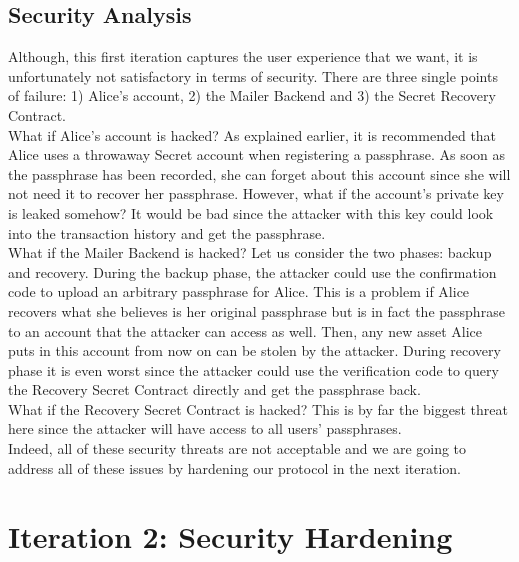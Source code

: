 \documentclass[12pt]{article}
\begin{document}
\subsection{Security Analysis}

Although, this first iteration captures the user experience that we want, it is unfortunately not satisfactory in terms of security. There are three single points of failure: 1) Alice's account, 2) the Mailer Backend and 3) the Secret Recovery Contract. \\

What if Alice's account is hacked? As explained earlier, it is recommended that Alice uses a throwaway Secret account when registering a passphrase. As soon as the passphrase has been recorded, she can forget about this account since she will not need it to recover her passphrase. However, what if the account's private key is leaked somehow? It would be bad since the attacker with this key could look into the transaction history and get the passphrase. \\

What if the Mailer Backend is hacked? Let us consider the two phases: backup and recovery. During the backup phase, the attacker could use the confirmation code to upload an arbitrary passphrase for Alice. This is a problem if Alice recovers what she believes is her original passphrase but is in fact the passphrase to an account that the attacker can access as well. Then, any new asset Alice puts in this account from now on can be stolen by the attacker. During recovery phase it is even worst since the attacker could use the verification code to query the Recovery Secret Contract directly and get the passphrase back. \\

What if the Recovery Secret Contract is hacked? This is by far the biggest threat here since the attacker will have access to all users' passphrases.  \\

Indeed, all of these security threats are not acceptable and we are going to address all of these issues by hardening our protocol in the next iteration. 

\section{Iteration  2: Security Hardening}
\label{iteration2}
\end{document}
